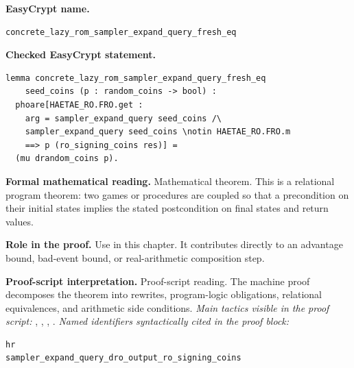 \begin{formaltheorem}
\noindent\textbf{EasyCrypt name.}
\begin{lstlisting}[language=EasyCrypt,basicstyle=\ttfamily\scriptsize]
concrete_lazy_rom_sampler_expand_query_fresh_eq
\end{lstlisting}
\noindent\textbf{Checked EasyCrypt statement.}
\begin{lstlisting}[language=EasyCrypt,basicstyle=\ttfamily\scriptsize]
lemma concrete_lazy_rom_sampler_expand_query_fresh_eq
    seed_coins (p : random_coins -> bool) :
  phoare[HAETAE_RO.FRO.get :
    arg = sampler_expand_query seed_coins /\
    sampler_expand_query seed_coins \notin HAETAE_RO.FRO.m
    ==> p (ro_signing_coins res)] =
  (mu drandom_coins p).
\end{lstlisting}
\noindent\textbf{Formal mathematical reading.}
Mathematical theorem. This is a relational program theorem: two games or procedures are coupled so that a precondition on their initial states implies the stated postcondition on final states and return values.

\noindent\textbf{Role in the proof.}
Use in this chapter. It contributes directly to an advantage bound, bad-event bound, or real-arithmetic composition step.

\noindent\textbf{Proof-script interpretation.}
Proof-script reading. The machine proof decomposes the theorem into rewrites, program-logic obligations, relational equivalences, and arithmetic side conditions.
\emph{Main tactics visible in the proof script:} \ec{proc}, \ec{wp}, \ec{rnd}, \ec{rewrite}.
\emph{Named identifiers syntactically cited in the proof block:}
\begin{lstlisting}[language=EasyCrypt,basicstyle=\ttfamily\scriptsize]
hr
sampler_expand_query_dro_output_ro_signing_coins
\end{lstlisting}

\end{formaltheorem}


